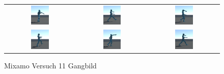 \begin{figure}[H]
  \centering
  \begin{tabular}{ccc}
    \includegraphics[width=0.27\textwidth]{img/charakter_mixamo_laufen1} & \includegraphics[width=0.27\textwidth]{img/charakter_mixamo_laufen2}  & \includegraphics[width=0.27\textwidth]{img/charakter_mixamo_laufen3} \\
    \includegraphics[width=0.27\textwidth]{img/charakter_mixamo_laufen4}  & \includegraphics[width=0.27\textwidth]{img/charakter_mixamo_laufen5}  & \includegraphics[width=0.27\textwidth]{img/charakter_mixamo_laufen6} \\
  \end{tabular}
  \caption{Mixamo Versuch 11 Gangbild}
  \label{fig:mixamo_versuch11_gangbild}
\end{figure}

